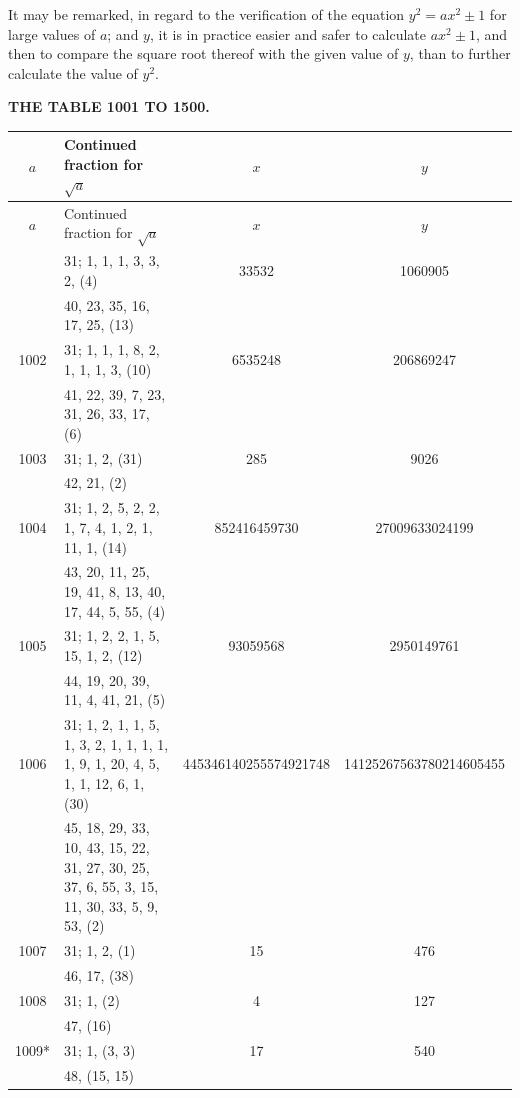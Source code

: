 \documentclass[12pt,a4paper]{article}
\begin{document}
It may be remarked, in regard to the verification of the equation $y^{2} = ax^{2} \pm 1$ for large values of $a$; and $y$, it is in practice easier and safer to calculate $ax^{2} \pm 1$, and then to compare the square root thereof with the given value of $y$, than to further calculate the value of $y^{2}$.

\newpage
\begin{center}
\textbf{THE TABLE 1001 TO 1500.}
\end{center}

\small
\begin{longtable}{|c|l|c|c|}
\hline
$a$ & Continued fraction for $\surd a$ & $x$ & $y$ \\
\hline
\endfirsthead
\hline
$a$ & Continued fraction for $\surd a$ & $x$ & $y$ \\
\hline
\endhead
\hline
\endfoot
1001 & 31; 1, 1, 1, 3, 3, 2, (4) & 33532 & 1060905 \\
     & 40, 23, 35, 16, 17, 25, (13) & & \\
\hline
1002 & 31; 1, 1, 1, 8, 2, 1, 1, 1, 3, (10) & 6535248 & 206869247 \\
     & 41, 22, 39, 7, 23, 31, 26, 33, 17, (6) & & \\
\hline
1003 & 31; 1, 2, (31) & 285 & 9026 \\
     & 42, 21, (2) & & \\
\hline
1004 & 31; 1, 2, 5, 2, 2, 1, 7, 4, 1, 2, 1, 11, 1, (14) & 852416459730 & 27009633024199 \\
     & 43, 20, 11, 25, 19, 41, 8, 13, 40, 17, 44, 5, 55, (4) & & \\
\hline
1005 & 31; 1, 2, 2, 1, 5, 15, 1, 2, (12) & 93059568 & 2950149761 \\
     & 44, 19, 20, 39, 11, 4, 41, 21, (5) & & \\
\hline
1006 & 31; 1, 2, 1, 1, 5, 1, 3, 2, 1, 1, 1, 1, 1, 9, 1, 20, 4, 5, 1, 1, 12, 6, 1, (30) & 445346140255574921748 & 14125267563780214605455 \\
     & 45, 18, 29, 33, 10, 43, 15, 22, 31, 27, 30, 25, 37, 6, 55, 3, 15, 11, 30, 33, 5, 9, 53, (2) & & \\
\hline
1007 & 31; 1, 2, (1) & 15 & 476 \\
     & 46, 17, (38) & & \\
\hline
1008 & 31; 1, (2) & 4 & 127 \\
     & 47, (16) & & \\
\hline
1009* & 31; 1, (3, 3) & 17 & 540 \\
     & 48, (15, 15) & & \\

\end{longtable}
\end{document}
